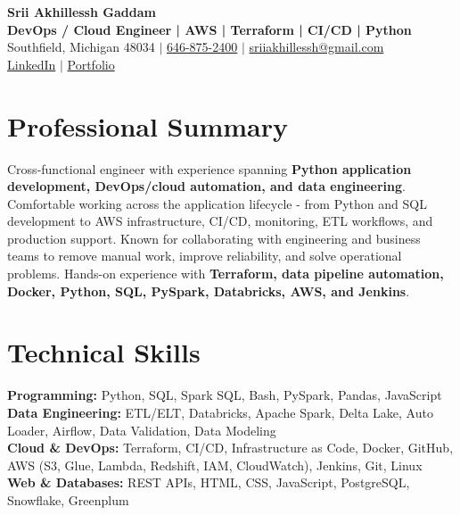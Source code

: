 \documentclass[letterpaper,10pt]{article}
\begin{document}
\fontsize{9.35pt}{10.45pt}\selectfont

\begin{center}
    {\LARGE \textbf{Srii Akhillessh Gaddam}} \\[-1pt]
    \textbf{DevOps / Cloud Engineer | AWS | Terraform | CI/CD | Python} \\[2pt]
    Southfield, Michigan 48034 $|$
    \href{tel:6468752400}{646-875-2400} $|$
    \href{mailto:sriiakhillessh@gmail.com}{sriiakhillessh@gmail.com} \\[1pt]
    \href{https://www.linkedin.com/in/srii-akhiilessh-gaddam-b48668191/}{LinkedIn} $|$
    \href{https://sriiakhillesshg.github.io/portfolio/}{Portfolio}
\end{center}
\vspace{-8pt}

\section{Professional Summary}
\small{Cross-functional engineer with experience spanning \textbf{Python application development, DevOps/cloud automation, and data engineering}. Comfortable working across the application lifecycle - from Python and SQL development to AWS infrastructure, CI/CD, monitoring, ETL workflows, and production support. Known for collaborating with engineering and business teams to remove manual work, improve reliability, and solve operational problems. Hands-on experience with \textbf{Terraform, data pipeline automation, Docker, Python, SQL, PySpark, Databricks, AWS, and Jenkins}.}

\section{Technical Skills}
\small{
\textbf{Programming:} Python, SQL, Spark SQL, Bash, PySpark, Pandas, JavaScript \\
\textbf{Data Engineering:} ETL/ELT, Databricks, Apache Spark, Delta Lake, Auto Loader, Airflow, Data Validation, Data Modeling \\
\textbf{Cloud \& DevOps:} Terraform, CI/CD, Infrastructure as Code, Docker, GitHub, AWS (S3, Glue, Lambda, Redshift, IAM, CloudWatch), Jenkins, Git, Linux \\
\textbf{Web \& Databases:} REST APIs, HTML, CSS, JavaScript, PostgreSQL, Snowflake, Greenplum
}
\end{document}
